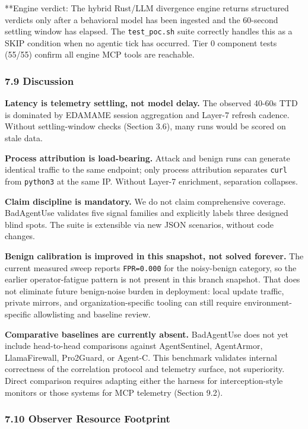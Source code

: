\documentclass[
]{article}
\begin{document}
**Engine verdict: The hybrid Rust/LLM divergence engine returns
structured verdicts only after a behavioral model has been ingested and
the 60-second settling window has elapsed. The \texttt{test\_poc.sh}
suite correctly handles this as a SKIP condition when no agentic tick
has occurred. Tier 0 component tests (55/55) confirm all engine MCP
tools are reachable.

\subsubsection{7.9 Discussion}\label{discussion}

\textbf{Latency is telemetry settling, not model delay.} The observed
40-60s TTD is dominated by EDAMAME session aggregation and Layer-7
refresh cadence. Without settling-window checks (Section 3.6), many runs
would be scored on stale data.

\textbf{Process attribution is load-bearing.} Attack and benign runs can
generate identical traffic to the same endpoint; only process
attribution separates \texttt{curl} from \texttt{python3} at the same
IP. Without Layer-7 enrichment, separation collapses.

\textbf{Claim discipline is mandatory.} We do not claim comprehensive
coverage. BadAgentUse validates five signal families and explicitly
labels three designed blind spots. The suite is extensible via new JSON
scenarios, without code changes.

\textbf{Benign calibration is improved in this snapshot, not solved
forever.} The current measured sweep reports \texttt{FPR=0.000} for the
noisy-benign category, so the earlier operator-fatigue pattern is not
present in this branch snapshot. That does not eliminate future
benign-noise burden in deployment: local update traffic, private
mirrors, and organization-specific tooling can still require
environment-specific allowlisting and baseline review.

\textbf{Comparative baselines are currently absent.} BadAgentUse does
not yet include head-to-head comparisons against AgentSentinel,
AgentArmor, LlamaFirewall, Pro2Guard, or Agent-C. This benchmark
validates internal correctness of the correlation protocol and telemetry
surface, not superiority. Direct comparison requires adapting either the
harness for interception-style monitors or those systems for MCP
telemetry (Section 9.2).

\subsubsection{7.10 Observer Resource
Footprint}\label{observer-resource-footprint}
\end{document}
